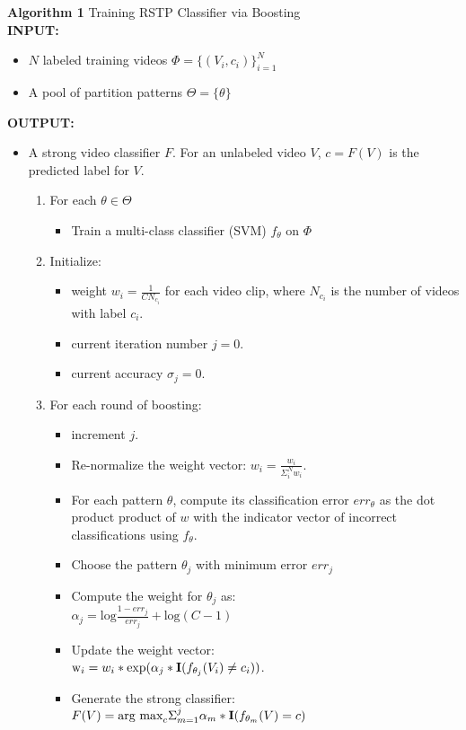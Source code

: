 \documentclass[10pt,twocolumn,letterpaper]{article}
\begin{document}
	\textbf{Algorithm 1} Training RSTP Classifier via Boosting \\
	\textbf{INPUT:} 
	\begin{itemize}
		\item $N$ labeled training videos $\Phi = \{(V_i, c_i)\}_{i=1}^N$
		\item A pool of partition patterns $\Theta = \{\theta\}$
	\end{itemize}
	\textbf{OUTPUT:}
	\begin{itemize}
		\item A strong video classifier $F$. For an unlabeled video $V$, 
			$c=F(V)$ is the predicted label for $V$.
			\begin{enumerate}

				\item For each $\theta \in \Theta$
					\begin{itemize}
						\item Train a multi-class classifier (SVM) $f_\theta$ on $\Phi$
					\end{itemize}

				\item Initialize:
					\begin{itemize}
						\item weight $w_i = \frac{1}{C N_{c_i}}$ for each video clip,
							where $N_{c_i}$ is the number of videos with label $c_i$.
						\item current iteration number $j=0$.
						\item current accuracy $\sigma_j = 0$.
					\end{itemize}

				\item For each round of boosting:
					\begin{itemize}
						\item increment $j$.
						\item Re-normalize the weight vector: $w_i = \frac{w_i}{\Sigma_i^N w_i}$.
					  \item For each pattern $\theta$, compute its classification
							error $err_\theta$ as the dot product product of $w$ with the indicator
							vector of incorrect classifications using $f_\theta$. 
						\item Choose the pattern $\theta_j$ with minimum error $err_j$
						\item Compute the weight for $\theta_j$ as: \\
							$\alpha_j = \mbox{log} \frac{1 - err_j}{err_j} + \mbox{log}(C
							- 1)$
						\item Update the weight vector:\\
							$\mbox w_i = w_i * \mbox{exp}(\alpha_j *
							\mbox{\textbf{I}}(f_{\theta_j}(V_i) \neq c_i))$.
						\item Generate the strong classifier: \\
							$F(V) = \mbox{arg max}_c \Sigma_{m=1}^j \alpha_m *
							\mbox{\textbf{I}}(f_{\theta_m}(V) = c)$
					\end{itemize}

			\end{enumerate}
	\end{itemize}
\end{document}
